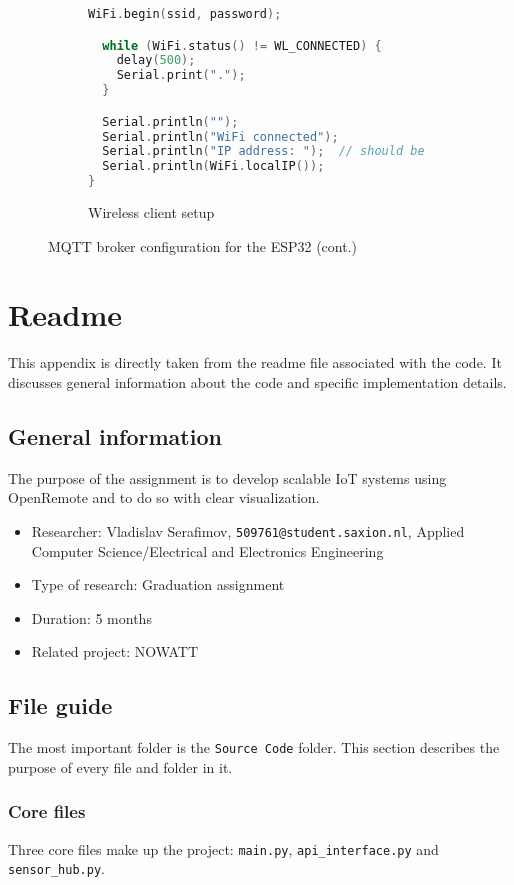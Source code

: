 \begin{appendices}
\begin{figure}[ht]
\begin{subfigure}{\textwidth}
\begin{lstlisting}[language=ino, firstnumber=1]
  WiFi.begin(ssid, password);

  while (WiFi.status() != WL_CONNECTED) {
    delay(500);
    Serial.print(".");
  }

  Serial.println("");
  Serial.println("WiFi connected");
  Serial.println("IP address: ");  // should be static
  Serial.println(WiFi.localIP());
}

        \end{lstlisting}
        \caption{Wireless client setup}
    \end{subfigure}
    
    \caption{MQTT broker configuration for the ESP32 (cont.)}
    \label{fig:mqtt_broker_full}
\end{figure}


\chapter{Readme}\label{chap:readme}
This appendix is directly taken from the readme file associated with the code. It discusses general information about the code and specific implementation details.

\section{General information}
The purpose of the assignment is to develop scalable IoT systems using OpenRemote and to do so with clear visualization.

\begin{itemize}
    \item Researcher: Vladislav Serafimov, \lstinline{509761@student.saxion.nl}, Applied Computer Science/Electrical and Electronics Engineering
    \item Type of research: Graduation assignment
    \item Duration: 5 months
    \item Related project: NOWATT
\end{itemize}


\section{File guide}
The most important folder is the \lstinline{Source Code} folder. This section describes the purpose of every file and folder in it.

\subsection{Core files}
Three core files make up the project: \lstinline{main.py}, \lstinline{api_interface.py} and \lstinline{sensor_hub.py}.


\end{appendices}
